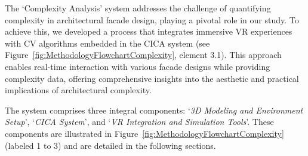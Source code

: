 
The `Complexity Analysis' system addresses the challenge of quantifying complexity in architectural facade design, playing a pivotal role in our study.
To achieve this, we developed a process that integrates immersive VR experiences with CV algorithms embedded in the CICA system (see Figure~\ref{fig:MethodologyFlowchartComplexity}, element 3.1).
This approach enables real-time interaction with various facade designs while providing complexity data, offering comprehensive insights into the aesthetic and practical implications of architectural complexity.

The system comprises three integral components: `\textit{3D Modeling and Environment Setup}', `\textit{CICA System}', and `\textit{VR Integration and Simulation Tools}'.
These components are illustrated in Figure~\ref{fig:MethodologyFlowchartComplexity} (labeled 1 to 3) and are detailed in the following sections.

%
%
